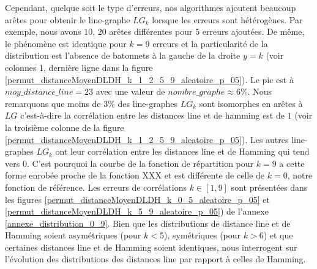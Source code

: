 Cependant, quelque soit le type d'erreurs, nos algorithmes ajoutent beaucoup ar\^etes pour obtenir le line-graphe $LG_k$ lorsque les erreurs sont h\'et\'erog\`enes. Par exemple, nous avons $10$, $20$ ar\^etes diff\'erentes  pour $5$ erreurs ajout\'ees.
\newline
De m\^eme, le ph\'enom\`ene est identique pour $k  = 9$ erreurs et la particularit\'e de la distribution est l'absence de batonnets \`a la gauche de la droite $y = k$ (voir colonnes 1, derni\`ere ligne dans la figure \ref{permut_distanceMoyenDLDH_k_1_2_5_9_aleatoire_p_05}).
Le pic est \`a $moy\_distance\_line = 23$ avec une valeur de $nombre\_graphe \approx 6 \%$.
Nous remarquons que moins de $3\%$ des line-graphes $LG_k$ sont isomorphes  en ar\^etes \`a $LG$ c'est-\`a-dire la corr\'elation entre les distances line et de hamming est de $1$ (voir la troisi\`eme colonne de la figure \ref{permut_distanceMoyenDLDH_k_1_2_5_9_aleatoire_p_05}). 
Les autres line-graphes $LG_k$ ont leur corr\'elation entre les distances line et de Hamming qui tend vers $0$.  C'est pourquoi la courbe de la fonction de r\'epartition  pour $k=9$  a cette forme enrob\'ee proche de la fonction  XXX  et est diff\'erente de celle de $k=0$, notre fonction de r\'ef\'erence.
Les erreurs de corr\'elations $k \in [1,9]$ sont pr\'esent\'ees dans les figures \ref{permut_distanceMoyenDLDH_k_0_5_aleatoire_p_05} et  \ref{permut_distanceMoyenDLDH_k_5_9_aleatoire_p_05}) de l'annexe \ref{annexe_distribution_0_9}.
\newline
Bien que les distributions de distance line et de Hamming soient asym\'etriques (pour $k < 5$), sym\'etriques (pour $k>6$) et que certaines distances line et de Hamming soient identiques, nous interrogent sur l'\'evolution des distributions des distances line par rapport \`a celles de Hamming. 



